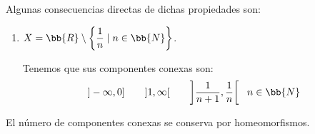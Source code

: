 \begin{ejemplo}
    Algunas consecuencias directas de dichas propiedades son:
    \begin{enumerate}
        \item $X=\bb{R}\setminus \left\{\dfrac{1}{n}\mid n\in \bb{N}\right\}$.

        Tenemos que sus componentes conexas son:
        \begin{equation*}
            ]-\infty, 0] \qquad ]1,\infty[ \qquad \left]\dfrac{1}{n+1}, \dfrac{1}{n}\right[~~n\in \bb{N}
        \end{equation*}
    \end{enumerate}
\end{ejemplo}



\begin{teo}
    El número de componentes conexas se conserva por homeomorfismos.
\end{teo}